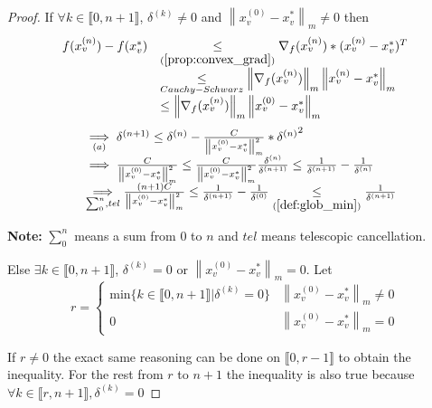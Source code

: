 \documentclass[11pt,en]{elegantpaper}
\newcommand{\norm}[1]{\left\lVert#1\right\rVert}
\begin{document}
\begin{proof}
  If $\forall k \in \llbracket 0,n+1 \rrbracket$, $\delta^{(k)} \neq 0$ and $\norm{x_v^{(0)} - x_v^*}_m \neq 0$ then
  \begin{equation*}
    \begin{array}{ll}
      f(x_v^{(n)}) - f(x_v^*) & \underset{(\ref{prop:convex_grad})}{\leq} \nabla_f(x_v^{(n)}) * (x_v^{(n)} - x_v^*)^T \\
      & \underset{Cauchy-Schwarz}{\leq} \norm{\nabla_f(x_v^{(n)})}_m \norm{x_v^{(n)} - x_v^*}_m \\
      & \leq \norm{\nabla_f(x_v^{(n)})}_m \norm{x_v^{(0)} - x_v^*}_m
    \end{array}
  \end{equation*}
  \begin{equation*}
    \begin{array}{ll}
      & \underset{(a)}{\implies} \delta^{(n+1)} \leq \delta^{(n)} - \frac{C}{\norm{x_v^{(0)} - x_v^*}_m^2} * {\delta^{(n)}}^2 \\
      & \implies \frac{C}{\norm{x_v^{(0)} - x_v^*}_m^2}
        \leq \frac{C}{\norm{x_v^{(0)} - x_v^*}_m^2} \frac{\delta^{(n)}}{\delta^{(n+1)}}
        \leq \frac{1}{\delta^{(n+1)}} - \frac{1}{\delta^{(n)}} \\
      & \underset{\sum_{0}^n,tel}\implies \frac{(n+1) C}{\norm{x_v^{(0)} - x_v^*}_m^2}
        \leq \frac{1}{\delta^{(n+1)}} - \frac{1}{\delta^{(0)}}
        \underset{(\ref{def:glob_min})}{\leq} \frac{1}{\delta^{(n+1)}}
    \end{array}
  \end{equation*} \par
  \textbf{Note:} $\sum_{0}^n$ means a sum from $0$ to $n$ and $tel$ means telescopic cancellation. \par

  Else $\exists k \in \llbracket 0,n+1 \rrbracket$, $\delta^{(k)} = 0$ or $\norm{x_v^{(0)} - x_v^*}_m = 0$.
  Let \begin{equation*}
    r = \left\{ \begin{array}{ll}
      \text{min} \{k \in \llbracket 0,n+1 \rrbracket | \delta^{(k)} = 0\} & \norm{x_v^{(0)} - x_v^*}_m \neq 0 \\
      0 & \norm{x_v^{(0)} - x_v^*}_m = 0
    \end{array} \right.
  \end{equation*} \par
  If $r \neq 0$ the exact same reasoning can be done on $\llbracket 0,r-1 \rrbracket$ to obtain the inequality.
  For the rest from $r$ to $n+1$ the inequality is also true because $\forall k \in \llbracket r,n+1 \rrbracket, \delta^{(k)} = 0$ \par
\end{proof}
\end{document}
